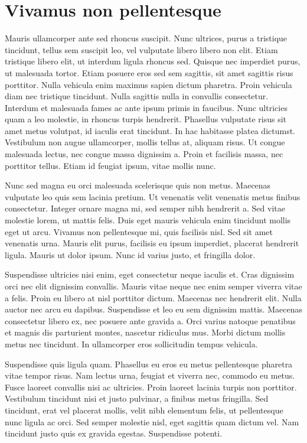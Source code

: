 \chapter{Vivamus non pellentesque}\label{chap:vivamus}
Mauris ullamcorper ante sed rhoncus suscipit. Nunc ultrices, purus a tristique tincidunt, tellus sem suscipit leo, vel vulputate libero libero non elit. Etiam tristique libero elit, ut interdum ligula rhoncus sed. Quisque nec imperdiet purus, ut malesuada tortor. Etiam posuere eros sed sem sagittis, sit amet sagittis risus porttitor. Nulla vehicula enim maximus sapien dictum pharetra. Proin vehicula diam nec tristique tincidunt. Nulla sagittis nulla in convallis consectetur. Interdum et malesuada fames ac ante ipsum primis in faucibus. Nunc ultricies quam a leo molestie, in rhoncus turpis hendrerit. Phasellus vulputate risus sit amet metus volutpat, id iaculis erat tincidunt. In hac habitasse platea dictumst. Vestibulum non augue ullamcorper, mollis tellus at, aliquam risus. Ut congue malesuada lectus, nec congue massa dignissim a. Proin et facilisis massa, nec porttitor tellus. Etiam id feugiat ipsum, vitae mollis nunc.\par

Nunc sed magna eu orci malesuada scelerisque quis non metus. Maecenas vulputate leo quis sem lacinia pretium. Ut venenatis velit venenatis metus finibus consectetur. Integer ornare magna mi, sed semper nibh hendrerit a. Sed vitae molestie lorem, ut mattis felis. Duis eget mauris vehicula enim tincidunt mollis eget ut arcu. Vivamus non pellentesque mi, quis facilisis nisl. Sed sit amet venenatis urna. Mauris elit purus, facilisis eu ipsum imperdiet, placerat hendrerit ligula. Mauris ut dolor ipsum. Nunc id varius justo, et fringilla dolor.\par

Suspendisse ultricies nisi enim, eget consectetur neque iaculis et. Cras dignissim orci nec elit dignissim convallis. Mauris vitae neque nec enim semper viverra vitae a felis. Proin eu libero at nisl porttitor dictum. Maecenas nec hendrerit elit. Nulla auctor nec arcu eu dapibus. Suspendisse et leo eu sem dignissim mattis. Maecenas consectetur libero ex, nec posuere ante gravida a. Orci varius natoque penatibus et magnis dis parturient montes, nascetur ridiculus mus. Morbi dictum mollis metus nec tincidunt. In ullamcorper eros sollicitudin tempus vehicula.\par

Suspendisse quis ligula quam. Phasellus eu eros eu metus pellentesque pharetra vitae tempor risus. Nam lectus urna, feugiat et viverra nec, commodo eu metus. Fusce laoreet convallis nisi ac ultricies. Proin laoreet lacinia turpis non porttitor. Vestibulum tincidunt nisi et justo pulvinar, a finibus metus fringilla. Sed tincidunt, erat vel placerat mollis, velit nibh elementum felis, ut pellentesque nunc ligula ac orci. Sed semper molestie nisl, eget sagittis quam dictum vel. Nam tincidunt justo quis ex gravida egestas. Suspendisse potenti.\par

